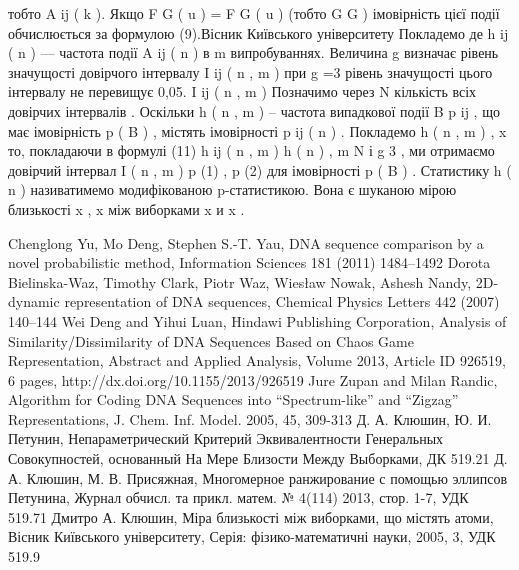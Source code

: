 \documentclass[14pt]{extarticle}
\begin{document}
тобто A ij ( k ). Якщо F G ( u ) = F G  ( u ) (тобто G  G  ) імовірність
цієї події обчислюється за формулою (9).Вісник Київського університету
Покладемо
де h ij ( n ) — частота події A ij ( n )
в m випробуваннях. Величина g визначає
рівень значущості довірчого інтервалу I ij ( n , m ) 
при g =3 рівень значущості цього інтервалу не перевищує 0,05.
I ij ( n , m )
Позначимо через N кількість всіх довірчих інтервалів
. Оскільки h ( n , m ) –
частота випадкової події B  p ij  , що має імовірність p ( B )  ,
містять імовірності p ij ( n ) . Покладемо h ( n , m ) , x 
то, покладаючи в формулі (11) h ij ( n , m )  h ( n ) , m  N і g  3 , ми отримаємо
довірчий інтервал I ( n , m )  p (1) , p (2)  для імовірності p ( B ) . Статистику h ( n )
називатимемо модифікованою p-статистикою. Вона є шуканою мірою
близькості  x  , x між виборками x  и x  .

\newpage
\begin{thebibliography}{9}

Chenglong Yu, Mo Deng, Stephen S.-T. Yau,
DNA sequence comparison by a novel probabilistic method,
Information Sciences 181 (2011) 1484–1492
Dorota Bielinska-Waz, Timothy Clark, Piotr Waz, Wiesław Nowak, Ashesh Nandy,
2D-dynamic representation of DNA sequences,
Chemical Physics Letters 442 (2007) 140–144
Wei Deng and Yihui Luan,
Hindawi Publishing Corporation,
Analysis of Similarity/Dissimilarity of DNA Sequences Based on Chaos Game Representation,
Abstract and Applied Analysis,
Volume 2013, Article ID 926519, 6 pages,
http://dx.doi.org/10.1155/2013/926519
Jure Zupan and Milan Randic,
Algorithm for Coding DNA Sequences into “Spectrum-like” and “Zigzag” Representations,
J. Chem. Inf. Model. 2005, 45, 309-313
Д. А. Клюшин, Ю. И. Петунин,
Непараметрический Критерий Эквивалентности Генеральных Совокупностей, основанный На Мере Близости Между Выборками,
ДК 519.21
Д. А. Клюшин, М. В. Присяжная,
Многомерное ранжирование с помощью эллипсов Петунина,
Журнал обчисл. та прикл. матем. № 4(114) 2013, стор. 1-7,
УДК 519.71
Дмитро А. Клюшин,
Міра близькості між виборками, що містять атоми,
Вісник Київського університету,
Серія: фізико-математичні науки,
2005, 3,
УДК 519.9

\end{thebibliography}
\end{document}
